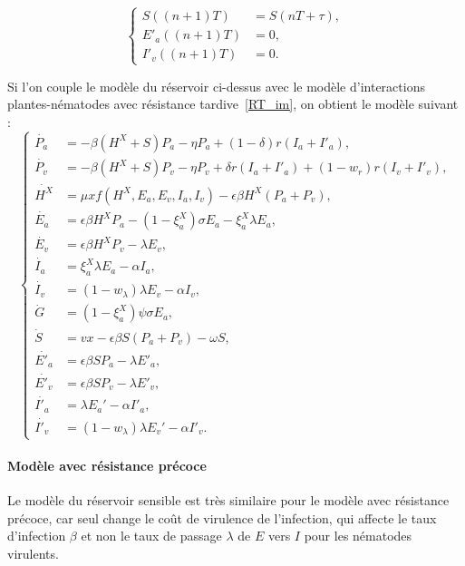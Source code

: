 	
\begin{equation}
	\left\{
		\begin{aligned}
		S((n+1)T)    &=S(nT+\tau),\\    
		E'_a ((n+1)T) &= 0,\\
		I'_v ((n+1)T) &= 0.
		\end{aligned}
	\right.
\label{eq:intersaison-plante-reservoir}
\end{equation}


Si l'on couple le modèle du réservoir ci-dessus avec le modèle d'interactions plantes-nématodes avec résistance tardive~\eqref{RT_im}, on obtient le modèle suivant :
\begin{equation}
  \left\{
    \begin{aligned}
      \dot{P_a} &= - \beta (H^X + S) P_a - \eta P_a + (1-\delta) r (I_a + I'_a),\\
      \dot{P_v} &= - \beta (H^X + S) P_v - \eta P_v + \delta r (I_a + I'_a) + (1-w_{r}) r (I_v + I'_v),\\
      \dot{H^X} &= \mu x f(H^X,E_a,E_v,I_a,I_v) - \epsilon \beta  H^X (P_a + P_v),\\
      \dot{E_a} &= \epsilon \beta H^X  P_a - (1-\xi^X_a) \sigma  E_a - \xi^X_a \lambda E_a,\\
      \dot{E_v} &= \epsilon \beta H^X P_v - \lambda E_v,\\
      \dot{I_a} &= \xi^X_a \lambda E_a  - \alpha I_a ,\\
      \dot{I_v} &= (1-w_{\lambda}) \lambda E_v - \alpha I_v,\\
      \dot{G} &= (1- \xi^X_a) \psi \sigma  E_a,\\
      \dot{S} &= v x - \epsilon \beta S (P_a + P_v) - \omega S,\\
      \dot{E'_a} &= \epsilon \beta S P_a - \lambda E'_a,\\
      \dot{E'_v} &= \epsilon \beta S P_v - \lambda E'_v,\\
      \dot{I'_a} &= \lambda E_a' - \alpha I'_a ,\\
      \dot{I'_v} &= (1-w_{\lambda}) \lambda E_v' - \alpha I'_v .
    \end{aligned}
  \right.
  \label{reservoir}
\end{equation}


\paragraph{Modèle avec résistance précoce}

Le modèle du réservoir sensible est très similaire pour le modèle avec résistance précoce, car seul change le coût de virulence de l'infection, qui affecte le taux d'infection $\beta$ et non le taux de passage $\lambda$ de $E$ vers $I$ pour les nématodes virulents.

